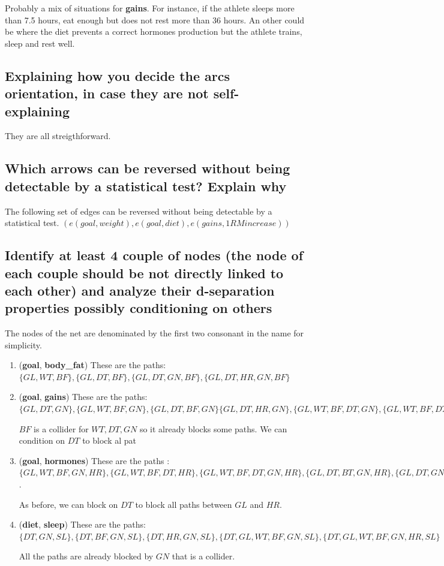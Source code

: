 \documentclass[11pt]{article}
\begin{document}
Probably a mix of situations for \textbf{gains}. For instance, if the athlete sleeps more than 7.5 hours, eat enough but does not rest more than 36 hours. An other could be where the diet prevents a correct hormones production but the athlete trains, sleep and rest well.

\subsection{Explaining how you decide the arcs orientation, in case they are not self- explaining}

They are all streigthforward.

\subsection{Which arrows can be reversed without being detectable by a statistical test? Explain why}

The following set of edges can be reversed without being detectable by a statistical test.
$(e(goal, weight), e(goal, diet), e(gains, 1RM increase))$


\subsection{Identify at least 4 couple of nodes (the node of each couple should be not directly linked to each other) and analyze their d-separation properties possibly conditioning on others}

The nodes of the net are denominated by the first two consonant in the name for simplicity.
\begin{enumerate}
	\item (\textbf{goal}, \textbf{body\_fat})
These are the paths: $\{GL,WT,BF\}, \{GL,DT,BF\}, \{GL,DT,GN,BF\}, \{GL,DT,HR,GN, BF\}$

\item (\textbf{goal}, \textbf{gains})
These are the paths: $\{GL,DT,GN\}, \{GL, WT, BF, GN\}, \{GL,DT, BF, GN\}  \{GL, DT ,HR, GN\}, \{GL, WT, BF, DT, GN \}, \{GL, WT, BF, DT, HR, GN \}$


$BF$ is a collider for $WT, DT, GN$ so it already blocks some paths. We can condition on $DT$ to block al pat
\item (\textbf{goal}, \textbf{hormones})
These are the paths : $\{GL, WT, BF, GN, HR \}, \{GL, WT, BF, DT, HR \}, \{GL, WT, BF, DT, GN, HR \}, \{GL, DT, BT, GN, HR \}, \{GL, DT, GN, HR \} \{GL, DT, HR \}$.

As before, we can block on $DT$ to block all paths between $GL$ and $HR$.

\item (\textbf{diet}, \textbf{sleep})
These are the paths: $\{DT, GN, SL \}, \{DT, BF, GN, SL \}, \{DT, HR, GN, SL \}, \{DT, GL , WT, BF, GN, SL \},  \{DT, GL , WT, BF, GN, HR, SL \}$

All the paths are already blocked by $GN$ that is a collider.
\end{enumerate}
\end{document}

